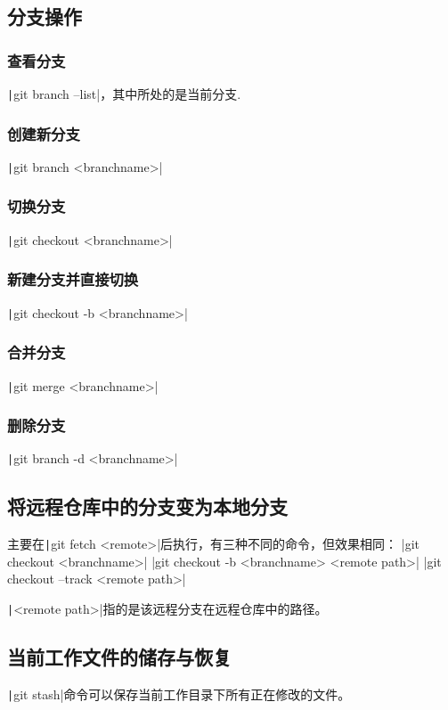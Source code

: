 \documentclass[fontset=ubuntu]{ctexart}
\begin{document}
\subsection{分支操作}
\subsubsection{查看分支}
\texttt|git branch --list|，其中\*所处的是当前分支.

\subsubsection{创建新分支}
\texttt|git branch <branchname>|

\subsubsection{切换分支}
\texttt|git checkout <branchname>|

\subsubsection{新建分支并直接切换}
\texttt|git checkout -b <branchname>|

\subsubsection{合并分支}
\texttt|git merge <branchname>|

\subsubsection{删除分支}
\texttt|git branch -d <branchname>|

\subsection{将远程仓库中的分支变为本地分支}
主要在\texttt|git fetch <remote>|后执行，有三种不同的命令，但效果相同：
|git checkout  <branchname>|
|git checkout -b <branchname> <remote path>|
|git checkout  --track <remote path>|

\texttt|<remote path>|指的是该远程分支在远程仓库中的路径。

\subsection{当前工作文件的储存与恢复}
\texttt|git stash|命令可以保存当前工作目录下所有正在修改的文件。
\end{document}
